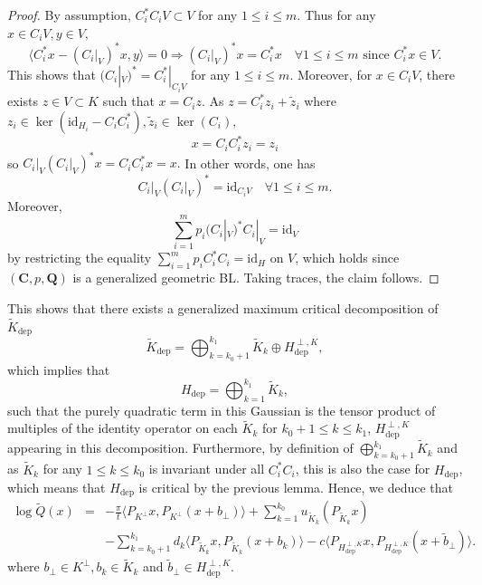\documentclass[11pt,a4paper,reqno]{amsart}
\numberwithin{equation}{section}
\theoremstyle{definition}
\newcommand{\ds}{\displaystyle}
\renewcommand{\tilde}{\widetilde}
\newcommand{\<}{\ensuremath \leq}
\renewcommand{\>}{\ensuremath \geq}
\renewcommand{\tilde}{\widetilde}
\begin{document}
\begin{proof}
     By assumption, $C_i^*C_iV \subset V$ for any $1 \leq i \leq m.$ Thus for any $x \in C_iV, y \in V,$ $$\langle C_i^*x-(C_i|_V)^*x,y\rangle=0 \Longrightarrow (C_i|_V)^*x=C_i^*x \quad \forall 1 \leq i \leq m \text{ since } C_i^*x \in V.$$ This shows that $(C_i|_V)^*=C_i^*|_{C_iV}$ for any $1 \leq i \leq m.$     
     Moreover, for $x \in C_iV$, there exists $z \in V \subset K$ such that $x=C_iz.$ As $z=C_i^*z_i+\tilde z_i$ where $z_i \in \ker(\mathrm{id}_{H_i}-C_iC_i^*), \tilde z_i \in \ker(C_i),$ $$ x=C_iC_i^* z_i= z_i$$ so $C_i|_V(C_i|_V)^*x=C_iC_i^*x=x.$ In other words, one has $$C_i|_V(C_i|_V)^*=\mathrm{id}_{C_iV} \quad \forall 1 \leq i \leq m.$$ Moreover, $$\sum_{i=1}^m p_i(C_i|_V)^*C_i|_V=\mathrm{id}_V$$ by restricting the equality $\ds \sum_{i=1}^m p_iC_i^*C_i=\mathrm{id}_H$ on $V$, which holds since $(\textbf{C},p,\textbf{Q})$ is a generalized geometric BL.  Taking traces, the claim follows.  
\end{proof}




This shows that there exists a generalized maximum critical decomposition of $\tilde K_{\mathrm{dep}}$ $$\tilde K_{\mathrm{dep}}=\bigoplus_{k=k_0+1}^{k_1}\tilde K_k \oplus H_{\mathrm{dep}}^{\perp,K},$$ which implies that $$H_{\mathrm{dep}}=\bigoplus_{k=1}^{k_1}\tilde K_k,$$ such that the purely quadratic term in this Gaussian is the tensor product of multiples of the identity operator on each $\tilde K_k$ for $k_0+1 \leq k \leq k_1$, $H_\mathrm{dep}^{\perp,K}$ appearing in this decomposition. Furthermore, by definition of $\bigoplus_{k=k_0+1}^{k_1}\tilde K_k$ and as $\tilde K_k$ for any $1 \leq k \leq k_0$ is invariant under all $C_i^*C_i$, this is also the case for $H_{\mathrm{dep}}$, which means that $H_{\mathrm{dep}}$ is critical by the previous lemma. Hence, we deduce that $$\begin{array}{lll}
\log \tilde Q(x)&=& \ds -\frac{\pi}{t} \langle P_{K^\perp}x,P_{K^\perp}(x+b_\perp)\rangle+\sum_{k=1}^{k_0}u_{\tilde K_k}(P_{\tilde K_k}x) \\
&& \ds -\sum_{k=k_0+1}^{k_1}d_k\langle P_{\tilde K_k}x,P_{\tilde K_k}(x+b_k)\rangle-c\langle P_{H_{\mathrm{dep}}^{\perp,K}}x,P_{H_{\mathrm{dep}}^{\perp,K}}(x+\tilde b_\perp)\rangle.\end{array}$$ where $b_\perp \in K^\perp, b_k \in \tilde K_k$ and $\tilde b_\perp \in H_{\mathrm{dep}}^{\perp,K}.$ 

\hfill \\
\end{document}
